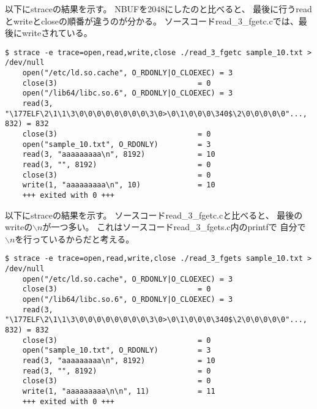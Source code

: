 \documentclass[12pt]{jarticle}
\begin{document}
\clearpage
{}

以下にstraceの結果を示す。
NBUFを2048にしたのと比べると、
最後に行うreadとwriteとcloseの順番が違うのが分かる。
ソースコードread\_3\_fgetc.cでは、最後にwriteされている。
\begin{lstlisting}[style = lstbash]
    $ strace -e trace=open,read,write,close ./read_3_fgetc sample_10.txt > /dev/null
    open("/etc/ld.so.cache", O_RDONLY|O_CLOEXEC) = 3
    close(3)                                = 0
    open("/lib64/libc.so.6", O_RDONLY|O_CLOEXEC) = 3
    read(3, "\177ELF\2\1\1\3\0\0\0\0\0\0\0\0\3\0>\0\1\0\0\0\340$\2\0\0\0\0\0"..., 832) = 832
    close(3)                                = 0
    open("sample_10.txt", O_RDONLY)         = 3
    read(3, "aaaaaaaaa\n", 8192)            = 10
    read(3, "", 8192)                       = 0
    close(3)                                = 0
    write(1, "aaaaaaaaa\n", 10)             = 10
    +++ exited with 0 +++
\end{lstlisting}


以下にstraceの結果を示す。
ソースコードread\_3\_fgetc.cと比べると、
最後のwriteの$\backslash n$が一つ多い。
これはソースコードread\_3\_fgets.c内のprintfで
自分で$\backslash n$を行っているからだと考える。
\begin{lstlisting}[style = lstbash]
    $ strace -e trace=open,read,write,close ./read_3_fgets sample_10.txt > /dev/null
    open("/etc/ld.so.cache", O_RDONLY|O_CLOEXEC) = 3
    close(3)                                = 0
    open("/lib64/libc.so.6", O_RDONLY|O_CLOEXEC) = 3
    read(3, "\177ELF\2\1\1\3\0\0\0\0\0\0\0\0\3\0>\0\1\0\0\0\340$\2\0\0\0\0\0"..., 832) = 832
    close(3)                                = 0
    open("sample_10.txt", O_RDONLY)         = 3
    read(3, "aaaaaaaaa\n", 8192)            = 10
    read(3, "", 8192)                       = 0
    close(3)                                = 0
    write(1, "aaaaaaaaa\n\n", 11)           = 11
    +++ exited with 0 +++
\end{lstlisting}

\clearpage
\end{document}
